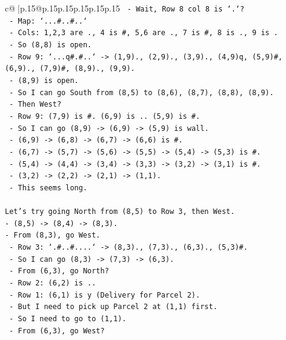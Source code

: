 \documentclass{article}
\begin{document}
{\begin{supertabular}{c@{$\;$}|p{.15\linewidth}@{}p{.15\linewidth}p{.15\linewidth}p{.15\linewidth}p{.15\linewidth}p{.15\linewidth}}
{{{\texttt{    {-} Wait, Row 8 col 8 is `.`?} \\
\texttt{      {-} Map: `...\#..\#..`} \\
\texttt{      {-} Cols: 1,2,3 are ., 4 is \#, 5,6 are ., 7 is \#, 8 is ., 9 is .} \\
\texttt{      {-} So (8,8) is open.} \\
\texttt{    {-} Row 9: `...q\#.\#..` {-}> (1,9)., (2,9)., (3,9)., (4,9)q, (5,9)\#, (6,9)., (7,9)\#, (8,9)., (9,9).} \\
\texttt{    {-} (8,9) is open.} \\
\texttt{  {-} So I can go South from (8,5) to (8,6), (8,7), (8,8), (8,9).} \\
\texttt{  {-} Then West?} \\
\texttt{    {-} Row 9: (7,9) is \#. (6,9) is .. (5,9) is \#.} \\
\texttt{    {-} So I can go (8,9) {-}> (6,9) {-}> (5,9) is wall.} \\
\texttt{    {-} (6,9) {-}> (6,8) {-}> (6,7) {-}> (6,6) is \#.} \\
\texttt{    {-} (6,7) {-}> (5,7) {-}> (5,6) {-}> (5,5) {-}> (5,4) {-}> (5,3) is \#.} \\
\texttt{    {-} (5,4) {-}> (4,4) {-}> (3,4) {-}> (3,3) {-}> (3,2) {-}> (3,1) is \#.} \\
\texttt{    {-} (3,2) {-}> (2,2) {-}> (2,1) {-}> (1,1).} \\
\texttt{  {-} This seems long.} \\
\\ 
\texttt{Let's try going North from (8,5) to Row 3, then West.} \\
\texttt{{-} (8,5) {-}> (8,4) {-}> (8,3).} \\
\texttt{{-} From (8,3), go West.} \\
\texttt{  {-} Row 3: `.\#..\#....` {-}> (8,3)., (7,3)., (6,3)., (5,3)\#.} \\
\texttt{  {-} So I can go (8,3) {-}> (7,3) {-}> (6,3).} \\
\texttt{  {-} From (6,3), go North?} \\
\texttt{    {-} Row 2: (6,2) is ..} \\
\texttt{    {-} Row 1: (6,1) is y (Delivery for Parcel 2).} \\
\texttt{    {-} But I need to pick up Parcel 2 at (1,1) first.} \\
\texttt{    {-} So I need to go to (1,1).} \\
\texttt{  {-} From (6,3), go West?} \\
}}}
\end{supertabular}}
\end{document}
